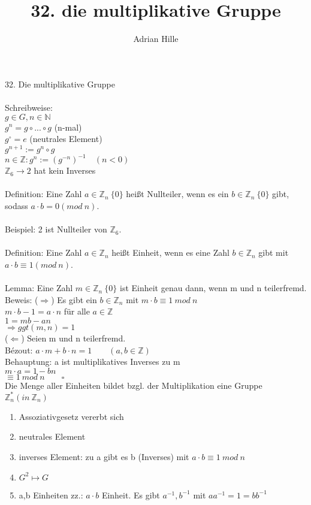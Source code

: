 \documentclass{scrartcl}
\title{32. die multiplikative Gruppe}
\author{Adrian Hille}
\begin{document}
\Large 32. Die multiplikative Gruppe\\
\\
\normalsize
Schreibweise:\\
$g \in G, n \in \mathbb{N}$\\
$g^n= g \circ ... \circ g$ (n-mal)\\
$g^{\circ}=e$ (neutrales Element)\\
$g^{n+1} := g^n \circ g$\\
$n \in \mathbb{Z}: g^n :=(g^{-n})^{-1} \quad (n <0)$\\
$\mathbb{Z}_6 \to 2$ hat kein Inverses\\
\\
Definition: Eine Zahl $a \in \mathbb{Z}_n \ \{0\}$ hei\ss t Nullteiler, wenn es ein $b \in \mathbb{Z}_n \ \{0\}$ gibt, sodass $a \cdot b = 0 (mod~n)$.\\
\\ 
Beispiel: 2 ist Nullteiler von $\mathbb{Z}_6$.\\
\\
Definition: Eine Zahl $a \in \mathbb{Z}_n$ hei\ss t Einheit, wenn es eine Zahl $b \in \mathbb{Z}_n$ gibt mit $a \cdot b \equiv 1 (mod~n)$.\\
\\
Lemma: Eine Zahl $m \in \mathbb{Z}_n \ \{0\}$ ist Einheit genau dann, wenn m und n teilerfremd.\\
Beweis: ($\Rightarrow$) Es gibt ein $b \in \mathbb{Z}_n$ mit $m \cdot b \equiv 1~mod~n$\\
$m \cdot b -1 = a \cdot n$ f\"ur alle $a \in \mathbb{Z}$\\
$1 = mb-an$\\
$\Rightarrow ggt(m,n)=1$\\
($\Leftarrow$) Seien m und n teilerfremd.\\
B\'{e}zout: $a \cdot m + b \cdot n = 1 \qquad (a,b \in \mathbb{Z} )$\\
Behauptung: a ist multiplikatives Inverses zu m\\
$m \cdot a = 1-bn$\\
$\equiv 1~mod~n \qquad \square$\\
Die Menge aller Einheiten bildet bzgl. der Multiplikation eine Gruppe $\mathbb{Z}_n^* (in~\mathbb{Z}_n)$\\
\begin{enumerate}
	\item Assoziativgesetz vererbt sich
	\item neutrales Element
	\item inverses Element: zu a gibt es b (Inverses) mit $a \cdot b \equiv 1~mod~n$
	\item $G^2 \mapsto G$
	\item a,b Einheiten zz.: $a \cdot b$ Einheit. Es gibt $a^{-1}, b^{-1}$ mit $aa^{-1} = 1 = bb^{-1}$ 
\end{enumerate}
\end{document}
